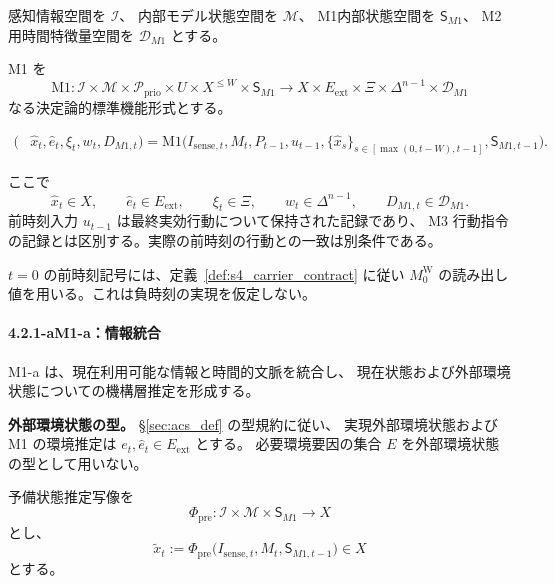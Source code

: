 \begin{definition}
\label{def:m1_map}
感知情報空間を $\mathcal I$、
内部モデル状態空間を $\mathcal M$、
M1内部状態空間を $\mathsf S_{M1}$、
M2用時間特徴量空間を $\mathcal D_{M1}$ とする。

M1 を
\[
  \mathrm{M1}:
  \mathcal I
  \times\mathcal M
  \times\mathcal P_{\mathrm{prio}}
  \times U
  \times X^{\le W}
  \times\mathsf S_{M1}
  \to
  X
  \times E_{\mathrm{ext}}
  \times\Xi
  \times\Delta^{n-1}
  \times\mathcal D_{M1}
\]
なる決定論的標準機能形式とする。

\[
\begin{aligned}
(&\hat x_t,\hat e_t,\xi_t,w_t,D_{M1,t})
=
\mathrm{M1}\bigl(
I_{\mathrm{sense},t},
M_t,
P_{t-1},
u_{t-1},
\{\hat x_s\}_{s\in[\max(0,t-W),t-1]},
\mathsf S_{M1,t-1}
\bigr).
\end{aligned}
\]

ここで
\[
  \hat x_t\in X,
  \qquad
  \hat e_t\in E_{\mathrm{ext}},
  \qquad
  \xi_t\in\Xi,
  \qquad
  w_t\in\Delta^{n-1},
  \qquad
  D_{M1,t}\in\mathcal D_{M1}.
\]
前時刻入力 $u_{t-1}$ は最終実効行動について保持された記録であり、
M3 行動指令の記録とは区別する。実際の前時刻の行動との一致は別条件である。

$t=0$ の前時刻記号には、定義~\ref{def:s4_carrier_contract} に従い
$M_0^{\mathrm W}$ の読み出し値を用いる。これは負時刻の実現を仮定しない。
\end{definition}

\paragraph*{4.2.1-a\quad M1-a：情報統合}

M1-a は、現在利用可能な情報と時間的文脈を統合し、
現在状態および外部環境状態についての機構層推定を形成する。

\noindent\textbf{外部環境状態の型。}
\S\ref{sec:acs_def} の型規約に従い、
実現外部環境状態および M1 の環境推定は
$e_t,\hat e_t\in E_{\mathrm{ext}}$
とする。
必要環境要因の集合 $E$ を外部環境状態の型として用いない。

\begin{definition}
\label{def:std_init}
予備状態推定写像を
\[
  \Phi_{\mathrm{pre}}:
  \mathcal I\times\mathcal M\times\mathsf S_{M1}
  \to X
\]
とし、
\[
  \tilde x_t
  :=
  \Phi_{\mathrm{pre}}
  \bigl(
    I_{\mathrm{sense},t},
    M_t,
    \mathsf S_{M1,t-1}
  \bigr)
  \in X
\]
とする。
\end{definition}

